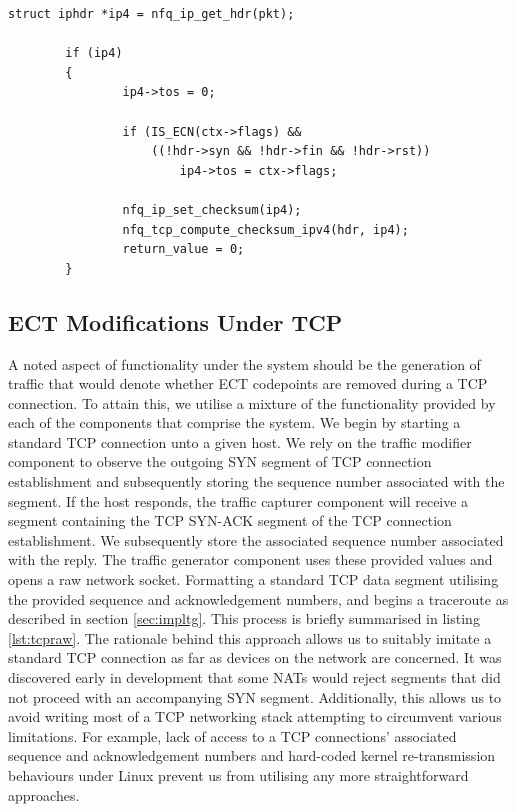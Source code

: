 \documentclass{l4proj}
\begin{document}
\begin{lstlisting}[caption={A demonstration of userspace modification of the traffic class byte on packets queued by the operating system kernel for transmission on the network.}]
struct iphdr *ip4 = nfq_ip_get_hdr(pkt);

        if (ip4)
        {
                ip4->tos = 0;

                if (IS_ECN(ctx->flags) && 
                    ((!hdr->syn && !hdr->fin && !hdr->rst))
                        ip4->tos = ctx->flags;

                nfq_ip_set_checksum(ip4);
                nfq_tcp_compute_checksum_ipv4(hdr, ip4);
                return_value = 0;
        }
\end{lstlisting}
\label{lst:libnf}


\subsection{ECT Modifications Under TCP}
\label{sec:tcponpath}


A noted aspect of functionality under the system should be the generation of traffic that would denote whether ECT codepoints are removed during a TCP connection. To attain this, we utilise a mixture of the functionality provided by each of the components that comprise the system. We begin by starting a standard TCP connection unto a given host. We rely on the traffic modifier component to observe the outgoing SYN segment of TCP connection establishment and subsequently storing the sequence number associated with the segment. If the host responds, the traffic capturer component will receive a segment containing the TCP SYN-ACK segment of the TCP connection establishment. We subsequently store the associated sequence number associated with the reply. The traffic generator component uses these provided values and opens a raw network socket. Formatting a standard TCP data segment utilising the provided sequence and acknowledgement numbers, and begins a traceroute as described in section \ref{sec:impltg}. This process is briefly summarised in listing \ref{lst:tcpraw}. The rationale behind this approach allows us to suitably imitate a standard TCP connection as far as devices on the network are concerned. It was discovered early in development that some NATs would reject segments that did not proceed with an accompanying SYN segment. Additionally, this allows us to avoid writing most of a TCP networking stack attempting to circumvent various limitations. For example, lack of access to a TCP connections' associated sequence and acknowledgement numbers and hard-coded kernel re-transmission behaviours under Linux prevent us from utilising any more straightforward approaches.
\end{document}
